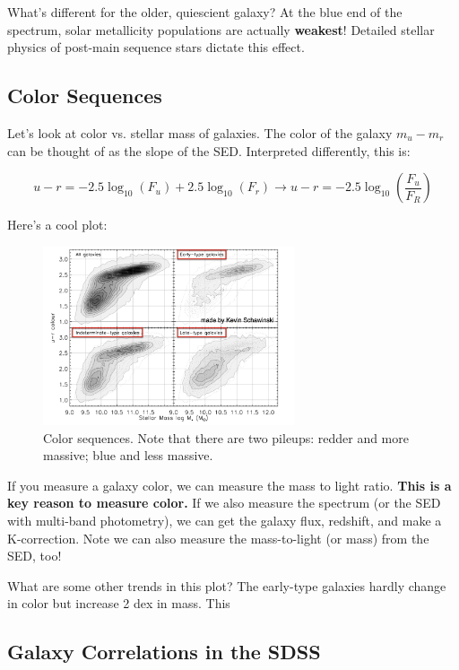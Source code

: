 \documentclass{article}
\begin{document}
What's different for the older, quiescient galaxy? At the blue end of the spectrum, solar metallicity populations are actually \textbf{weakest}! Detailed stellar physics of post-main sequence stars dictate this effect. 

\subsection{Color Sequences}

Let's look at color vs. stellar mass of galaxies. The color of the galaxy $m_u - m_r$ can be thought of as the slope of the SED. Interpreted differently, this is:

\begin{equation}
    u -r = -2.5\log_{10}(F_u) + 2.5\log_{10}(F_r) \rightarrow \boxed{u-r = -2.5\log_{10}\left(\frac{F_u}{F_R}\right)}
\end{equation}

Here's a cool plot:

\begin{figure}
    \centering
    \includegraphics[width=0.66\textwidth]{figs/Screen Shot 2021-09-02 at 9.41.59 AM.png}
    \caption{Color sequences. Note that there are two pileups: redder and more massive; blue and less massive.}
    \label{fig:color_sequences}
\end{figure}

If you measure a galaxy color, we can measure the mass to light ratio. \textbf{This is a key reason to measure color.} If we also measure the spectrum (or the SED with multi-band photometry), we can get the galaxy flux, redshift, and make a K-correction. Note we can also measure the mass-to-light (or mass) from the SED, too! 

What are some other trends in this plot? The early-type galaxies hardly change in color but increase 2 dex in mass. This 

\subsection{Galaxy Correlations in the SDSS}
\end{document}
